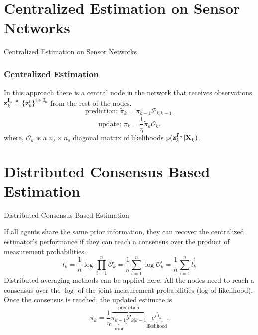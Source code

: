 \documentclass{beamer}
\theoremstyle{remark}
\newcommand{\XX}[3][2]{\mathbf{X}_{\tiny #2}^{\tiny #3}}
\newcommand{\pr}{\textrm{p}}
\newcommand{\bIn}{\boldsymbol{I}_{\boldsymbol{n}}}
\newcommand{\zz}[3][2]{\mathbf{z}_{ #2}^{ #3}}
\begin{document}
\section{Centralized Estimation on Sensor Networks}
\begin{frame}{Centralized Estimation on Sensor Networks}
	\subsubsection*{Centralized Estimation} In this approach there is a central node in the network that receives observations $\zz{k}{\bIn} \triangleq \{\zz{k}{i}\}^{i\in\bIn}$ from the rest of the nodes. 
	\begin{equation*}
	\label{eq:pred}
	\text{prediction: } \tilde{\pi}_{k} =  \pi_{k-1}\mathcal{P}_{k \vert k-1}.
	\end{equation*}
	\begin{equation*}
	\label{eq:update}
	\text{update: } {\pi}_{k} = \frac{1}{\eta}\tilde{\pi}_{k} \mathcal{O}_k.
	\end{equation*}
	where, $\mathcal{O}_k$ is a $n_s\times n_s$ diagonal matrix of likelihoods $\pr(\zz{k}{\bIn}| \XX[]{k}{})$. 
	
\end{frame}

\section{Distributed Consensus Based Estimation}
\begin{frame}{Distributed Consensus Based Estimation}
	
	If all agents share the same prior information, they can recover the centralized estimator's performance if they can reach a consensus over the product of measurement probabilities.
	{\color{blue}\begin{equation*}
		\tilde{l}_k  = \frac{1}{n} \log \prod_{i=1}^{n} \mathcal{O}_k^i  = \frac{1}{n} \sum_{i=1}^{n} \log \mathcal{O}_k^i = \frac{1}{n} \sum_{i=1}^{n} \tilde{l}_k^i
		\end{equation*}}
	{\color{red}Distributed averaging methods can be applied here.} All the nodes need to reach a consensus over the $\log$ of the joint measurement probabilities (log-of-likelihood).
	Once the consensus is reached, the updated estimate is 
	{\color{blue}
		\begin{equation*}
			{\pi}_{k}  = \frac{1}{\eta}\overbrace{ \underbrace{{\pi}_{k-1}}_{\text{prior}} 
				\mathcal{P}_{k \vert k-1}  
			}^{\text{prediction}}\underbrace{e^{n\tilde{l}_k}}_{\text{likelihood}}.
		\end{equation*}}
\end{frame}
\end{document}
